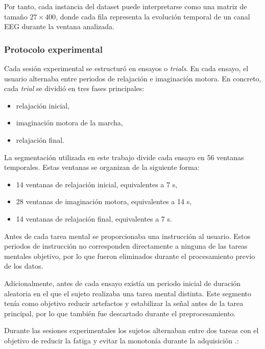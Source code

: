 Por tanto, cada instancia del dataset puede interpretarse como una matriz de tamaño \(27 \times 400\), donde cada fila representa la evolución temporal de un canal EEG durante la ventana analizada.



\subsubsection{Protocolo experimental}

Cada sesión experimental se estructuró en ensayos o \textit{trials}. En cada ensayo, el usuario alternaba entre periodos de relajación e imaginación motora. En concreto, cada \textit{trial} se dividió en tres fases principales:

\begin{itemize}
    \item relajación inicial,
    \item imaginación motora de la marcha,
    \item relajación final.
\end{itemize}

La segmentación utilizada en este trabajo divide cada ensayo en 56 ventanas temporales. Estas ventanas se organizan de la siguiente forma:

\begin{itemize}
    \item 14 ventanas de relajación inicial, equivalentes a 7 s,
    \item 28 ventanas de imaginación motora, equivalentes a 14 s,
    \item 14 ventanas de relajación final, equivalentes a 7 s.
\end{itemize}

Antes de cada tarea mental se proporcionaba una instrucción al usuario. Estos periodos de instrucción no corresponden directamente a ninguna de las tareas mentales objetivo, por lo que fueron eliminados durante el procesamiento previo de los datos.

Adicionalmente, antes de cada ensayo existía un periodo inicial de duración aleatoria en el que el sujeto realizaba una tarea mental distinta. Este segmento tenía como objetivo reducir artefactos y estabilizar la señal antes de la tarea principal, por lo que también fue descartado durante el preprocesamiento.

Durante las sesiones experimentales los sujetos alternaban entre dos tareas con el objetivo de reducir la fatiga y evitar la monotonía durante la adquisición \cite{ferrero_BrainMachine2024}.:

